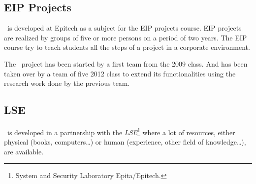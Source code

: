 \documentclass[american]{rtxarticle}
\begin{document}
\subsection*{EIP Projects}

\rtx\ is developed at Epitech as a subject for the EIP projects course. EIP
projects are realized by groups of five or more persons on a period of two
years. The EIP course try to teach students all the steps of a project in a
corporate environment.

The \rtx\ project has been started by a first team from the 2009 class. And has
been taken over by a team of five 2012 class to extend its functionalities using
the research work done by the previous team.

\subsection*{LSE}

\rtx\ is developed in a partnership with the \emph{LSE}\footnote{System and
Security Laboratory Epita/Epitech.} where a lot of resources, either physical
(books, computers\ldots) or human (experience, other field of knowledge\ldots),
are available.

\rtxmaketitleblock
\end{document}
